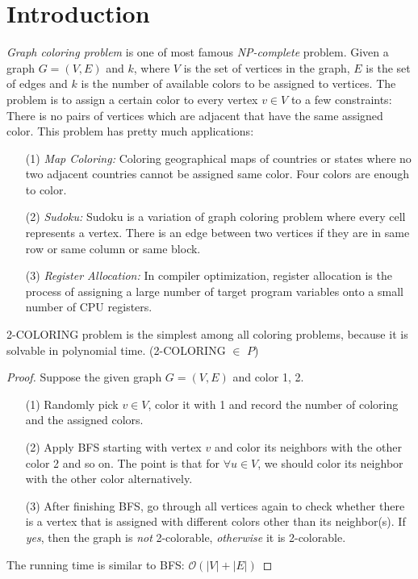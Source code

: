 \section{Introduction}
\textit{Graph coloring problem} is one of most famous \textit{NP-complete} problem. Given a graph $G = (V, E)$ and $k$, where $V$ is the set of vertices in the graph, $E$ is the set of edges and $k$ is the number of available colors to be assigned to vertices. The problem is to assign a certain color to every vertex $v \in V$ to a few constraints: There is no pairs of vertices which are adjacent that have the same assigned color.
This problem has pretty much applications:
\begin{itemize}
    \item[(1)] \textit{Map Coloring:} Coloring geographical maps of countries or states where no two adjacent countries cannot be assigned same color. Four colors are enough to color.
    \item[(2)] \textit{Sudoku:} Sudoku is a variation of graph coloring problem where every cell represents a vertex. There is an edge between two vertices if they are in same row or same column or same block.
    \item[(3)] \textit{Register Allocation:} In compiler optimization, register allocation is the process of assigning a large number of target program variables onto a small number of CPU registers.\cite{example}
\end{itemize}

\begin{claim}
2-COLORING problem is the simplest among all coloring problems, because it is solvable in polynomial time. (2-COLORING $\in$ $P$)
\end{claim}

\begin{proof}
Suppose the given graph $G = (V, E)$ and color 1, 2. 
\begin{itemize}
    \item[(1)] Randomly pick $v \in V$, color it with 1 and record the number of coloring and the assigned colors.
    \item[(2)] Apply BFS starting with vertex $v$ and color its neighbors with the other color 2 and so on. The point is that for $\forall u \in V$, we should color its neighbor with the other color alternatively.
    \item[(3)] After finishing BFS, go through all vertices again to check whether there is a vertex that is assigned with different colors other than its neighbor(s). If \textit{yes}, then the graph is \textit{not} 2-colorable, \textit{otherwise} it is 2-colorable.
\end{itemize}
The running time is similar to BFS: $\mathcal{O}(|V| + |E|)$
\end{proof}

